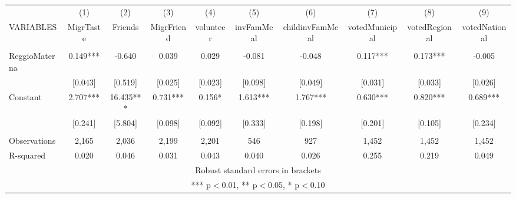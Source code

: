 \begin{tabular}{lccccccccc} \hline
 & (1) & (2) & (3) & (4) & (5) & (6) & (7) & (8) & (9) \\
VARIABLES & MigrTaste & Friends & MigrFriend & volunteer & invFamMeal & childinvFamMeal & votedMunicipal & votedRegional & votedNational \\ \hline
 &  &  &  &  &  &  &  &  &  \\
ReggioMaterna & 0.149*** & -0.640 & 0.039 & 0.029 & -0.081 & -0.048 & 0.117*** & 0.173*** & -0.005 \\
 & [0.043] & [0.519] & [0.025] & [0.023] & [0.098] & [0.049] & [0.031] & [0.033] & [0.026] \\
Constant & 2.707*** & 16.435*** & 0.731*** & 0.156* & 1.613*** & 1.767*** & 0.630*** & 0.820*** & 0.689*** \\
 & [0.241] & [5.804] & [0.098] & [0.092] & [0.333] & [0.198] & [0.201] & [0.105] & [0.234] \\
 &  &  &  &  &  &  &  &  &  \\
Observations & 2,165 & 2,036 & 2,199 & 2,201 & 546 & 927 & 1,452 & 1,452 & 1,452 \\
 R-squared & 0.020 & 0.046 & 0.031 & 0.043 & 0.040 & 0.026 & 0.255 & 0.219 & 0.049 \\ \hline
\multicolumn{10}{c}{ Robust standard errors in brackets} \\
\multicolumn{10}{c}{ *** p$<$0.01, ** p$<$0.05, * p$<$0.10} \\
\end{tabular}
